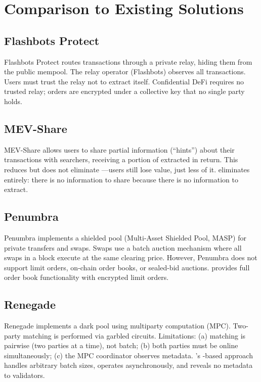 \section{Comparison to Existing Solutions}

\label{sec:comparison}

\subsection{Flashbots Protect}

Flashbots Protect routes transactions through a private relay, hiding them from the public mempool. The relay operator (Flashbots) observes all transactions. Users must trust the relay not to extract \MEV{} itself. \Zoo{} Confidential DeFi requires no trusted relay; orders are encrypted under a collective key that no single party holds.

\subsection{MEV-Share}

MEV-Share allows users to share partial information (``hints'') about their transactions with searchers, receiving a portion of extracted \MEV{} in return. This reduces but does not eliminate \MEV{}---users still lose value, just less of it. \Zoo{} eliminates \MEV{} entirely: there is no information to share because there is no information to extract.

\subsection{Penumbra}

Penumbra implements a shielded pool (Multi-Asset Shielded Pool, MASP) for private transfers and swaps. Swaps use a batch auction mechanism where all swaps in a block execute at the same clearing price. However, Penumbra does not support limit orders, on-chain order books, or sealed-bid auctions. \Zoo{} provides full order book functionality with encrypted limit orders.

\subsection{Renegade}

Renegade implements a dark pool using multiparty computation (MPC). Two-party matching is performed via garbled circuits. Limitations: (a) matching is pairwise (two parties at a time), not batch; (b) both parties must be online simultaneously; (c) the MPC coordinator observes metadata. \Zoo{}'s \FHE{}-based approach handles arbitrary batch sizes, operates asynchronously, and reveals no metadata to validators.

